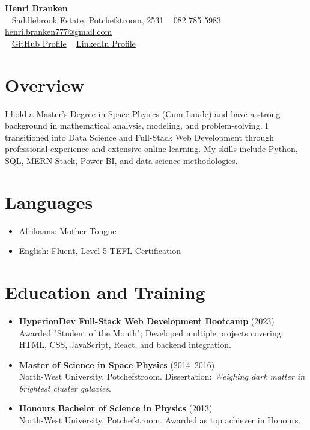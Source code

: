 \documentclass[a4paper,10pt]{article}
\begin{document}
	
\begin{center}
	{\LARGE\textbf{Henri Branken}}\\[0.5cm]
	\faHome~ Saddlebrook Estate, Potchefstroom, 2531 \quad
	\faPhone~ 082 785 5983 \quad
	\faEnvelope~ \href{mailto:henri.branken777@gmail.com}{henri.branken777@gmail.com}\\
	\faGithub~ \href{https://github.com/HenriBranken}{GitHub Profile} \quad
	\faLinkedin~ \href{https://www.linkedin.com/in/henri-branken-1423a2153/}{LinkedIn Profile}
\end{center}
	
\section*{Overview}
I hold a Master’s Degree in Space Physics (Cum Laude) and have a strong background in mathematical analysis, modeling, and problem-solving. I transitioned into Data Science and Full-Stack Web Development through professional experience and extensive online learning. My skills include Python, SQL, MERN Stack, Power BI, and data science methodologies.

\section*{Languages}
\begin{itemize}
	\item Afrikaans: Mother Tongue
	\item English: Fluent, Level 5 TEFL Certification
\end{itemize}

\section*{Education and Training}
\begin{itemize}
	\item \textbf{HyperionDev Full-Stack Web Development Bootcamp} (2023)\\
	Awarded "Student of the Month"; Developed multiple projects covering HTML, CSS, JavaScript, React, and backend integration.
	\item \textbf{Master of Science in Space Physics} (2014--2016)\\
	North-West University, Potchefstroom. Dissertation: \textit{Weighing dark matter in brightest cluster galaxies}.
	\item \textbf{Honours Bachelor of Science in Physics} (2013)\\
	North-West University, Potchefstroom. Awarded as top achiever in Honours.
\end{itemize}
\end{document}
